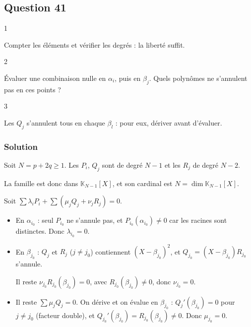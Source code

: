 \documentclass[11pt,a4paper]{article}
\begin{document}
\hypertarget{question-41}{%
\subsection{Question 41}\label{question-41}}

\begin{indication}{1}

Compter les éléments et vérifier les degrés : la liberté suffit.

\end{indication}

\begin{indication}{2}

Évaluer une combinaison nulle en \(\alpha_i\), puis en \(\beta_j\). Quels polynômes ne s'annulent pas en ces points ?

\end{indication}

\begin{indication}{3}

Les \(Q_j\) s'annulent tous en chaque \(\beta_l\) : pour eux, dériver avant d'évaluer.

\end{indication}

\hypertarget{solution-40}{%
\subsubsection{Solution}\label{solution-40}}

Soit \(N=p+2q\ge1\). Les \(P_i\), \(Q_j\) sont de degré \(N-1\) et les \(R_j\) de degré \(N-2\).

La famille est donc dans \(\mathbb K_{N-1}[X]\), et son cardinal est \(N=\dim\mathbb K_{N-1}[X]\).

Soit \(\sum\lambda_iP_i+\sum(\mu_jQ_j+\nu_jR_j)=0\).

\begin{itemize}
\item
  En \(\alpha_{i_0}\) : seul \(P_{i_0}\) ne s'annule pas, et \(P_{i_0}(\alpha_{i_0})\neq0\) car les racines sont distinctes. Donc \(\lambda_{i_0}=0\).
\item
  En \(\beta_{j_0}\) : \(Q_j\) et \(R_j\) (\(j\neq j_0\)) contiennent \((X-\beta_{j_0})^2\), et \(Q_{j_0}=(X-\beta_{j_0})R_{j_0}\) s'annule.

  Il reste \(\nu_{j_0}R_{j_0}(\beta_{j_0})=0\), avec \(R_{j_0}(\beta_{j_0})\neq0\), donc \(\nu_{j_0}=0\).
\item
  Il reste \(\sum\mu_jQ_j=0\). On dérive et on évalue en \(\beta_{j_0}\) : \(Q_j'(\beta_{j_0})=0\) pour \(j\neq j_0\) (facteur double), et \(Q_{j_0}'(\beta_{j_0})=R_{j_0}(\beta_{j_0})\neq0\). Donc \(\mu_{j_0}=0\).
\end{itemize}
\end{document}
